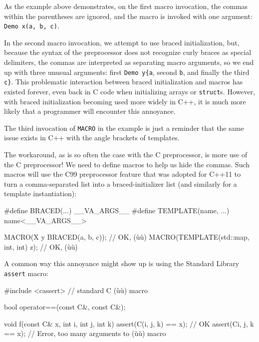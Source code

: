 \noindent As the example above demonstrates, on the first macro invocation, the
commas within the parentheses are ignored, and the macro is invoked with
one argument: \lstinline!Demo!~\lstinline!x(a,!~\lstinline!b,!~\lstinline!c)!.

In the second macro invocation, we attempt to use braced initialization,
but, because the syntax of the preprocessor does not recognize curly
braces as special delimiters, the commas are interpreted as separating
macro arguments, so we end up with three unusual arguments: first
\lstinline!Demo!~\lstinline!y{a!, second \lstinline!b!, and finally the third
\lstinline!c}!. This problematic interaction between braced initialization
and macros has existed forever, even back in C code when initializing
arrays or \lstinline!struct!s. However, with braced initialization becoming
used more widely in C++, it is much more likely that a programmer will
encounter this annoyance.

The third invocation of \lstinline!MACRO! in the example is just a reminder
that the same issue exists in C++ with the angle brackets of templates.

The workaround, as is so often the case with the C preprocessor, is more
use of the C preprocessor! We need to define macros to help us hide the
commas. Such macros will use the  C99
preprocessor feature that was adopted for C++11 to turn a
comma-separated list into a braced-initializer list (and similarly for a
template instantiation):

\begin{emcppslisting}[emcppsbatch=e21]
#define BRACED(...) { __VA_ARGS__ }
#define TEMPLATE(name, ...) name<__VA_ARGS__>

MACRO(X y BRACED(a, b, c));             // OK, (ù{}ù)
MACRO(TEMPLATE(std::map, int, int) z);  // OK, (ù{}ù)
\end{emcppslisting}
    

\noindent A common way this annoyance might show up is using the Standard Library
\lstinline!assert! macro:

\begin{emcppshiddenlisting}[emcppsbatch=e21]
#include <cassert>  // standard C (ù{}ù) macro
\end{emcppshiddenlisting}
\begin{emcppslisting}[emcppsbatch=e21]
bool operator==(const C&, const C&);

void f(const C& x, int i, int j, int k)
{
   assert(C(i, j, k) == x);  // OK
   assert(C{i, j, k} == x);  // Error, too many arguments to (ù{}ù) macro
}
\end{emcppslisting}
    

